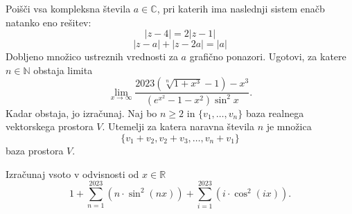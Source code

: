 \documentclass[sumniki]{izpit}
\begin{document}


\naloga[\tocke{25}] Poišči vsa kompleksna števila \(a \in \mathbb{C}\), pri katerih ima naslednji sistem enačb natanko eno rešitev:
\[|z-4|=2|z-1|\]
\[|z-a|+|z-2a|=|a|\]
Dobljeno množico ustreznih vrednosti za \(a\) grafično ponazori.
\naloga[\tocke{25}] Ugotovi, za katere \(n \in \mathbb{N}\) obstaja limita
\[\lim_{x \to \infty}\frac{2023\left(\sqrt[n]{1+x^3}-1\right)-x^3}{(e^{x^2}-1-x^2)\sin^2 x}.\]
Kadar obstaja, jo izračunaj.
\naloga[\tocke{25}] Naj bo \(n \geq 2\) in \(\{v_1,\ldots,v_n\}\) baza realnega vektorskega prostora \(V\). 
Utemelji za katera naravna števila \(n\) je množica 
\[\{v_1+v_2,v_2+v_3,\ldots,v_n+v_1\}\]
baza prostora \(V\).

\naloga[\tocke{25}] Izračunaj vsoto v odvisnosti od $x \in \mathbb{R}$
\[1+ \sum_{n=1}^{2023}\left(n\cdot\sin^2(nx)\right)+\sum_{i=1}^{2023}\left(i\cdot\cos^2(ix)\right).\]
\end{document}
